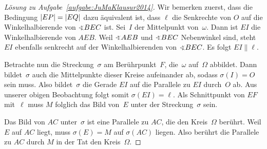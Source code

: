 \begin{proof}[Lösung zu Aufgabe~\ref{aufgabe:JuMaKlausur2014}]
	Wir bemerken zuerst, dass die Bedingung $\abs*{EP}=\abs*{EQ}$ dazu äquivalent ist, dass $\ell$ die Senkrechte von $O$ auf die Winkelhalbierende von $\winkel BEC$ ist. Sei~$I$ der Mittelpunkt von~$\omega$. Dann ist $EI$ die Winkelhalbierende von $AEB$. Weil $\winkel AEB$ und $\winkel BEC$ Nebenwinkel sind, steht $EI$ ebenfalls senkrecht auf der Winkelhalbierenden von $\winkel BEC$. Es folgt $EI\parallel \ell$.
	
	Betrachte nun die Streckung~$\sigma$ am Berührpunkt~$F$, die~$\omega$ auf~$\Omega$ abbildet. Dann bildet~$\sigma$ auch die Mittelpunkte dieser Kreise aufeinander ab, sodass $\sigma(I)=O$ sein muss. Also bildet~$\sigma$ die Gerade $EI$ auf die Parallele zu $EI$ durch~$O$ ab. Aus unserer obigen Beobachtung folgt somit $\sigma(EI)=\ell$. Als Schnittpunkt von $EF$ mit~$\ell$ muss $M$ folglich das Bild von~$E$ unter der Streckung~$\sigma$ sein.
	
	Das Bild von $AC$ unter~$\sigma$ ist eine Parallele zu $AC$, die den Kreis~$\Omega$ berührt. Weil $E$ auf $AC$ liegt, muss $\sigma(E)=M$ auf $\sigma(AC)$ liegen. Also berührt die Parallele zu $AC$ durch $M$ in der Tat den Kreis~$\Omega$.
\end{proof}